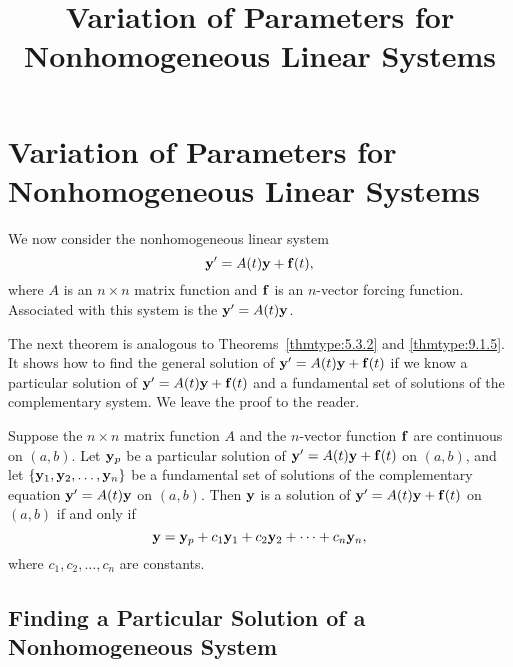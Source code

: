 \documentclass{ximera}
\title{Variation of Parameters for Nonhomogeneous Linear Systems}%
\begin{document}
\begin{abstract}

\end{abstract}

\maketitle

\section*{Variation of Parameters for Nonhomogeneous Linear Systems}

We now consider the nonhomogeneous linear system
$$
{\bf y}'= A(t){\bf y}+{\bf f}(t),
$$
where $A$ is an $n\times n$ matrix function and ${\bf f}$ is an
$n$-vector forcing function. Associated with this system is the  ${\bf y}'=A(t){\bf y}$.

The next theorem is analogous to
Theorems~\ref{thmtype:5.3.2} and
\ref{thmtype:9.1.5}. It shows how to find the general solution
of
${\bf y}'=A(t){\bf y}+{\bf f}(t)$ if we know a particular solution of ${\bf
y}'=A(t){\bf y}+{\bf f}(t)$ and a fundamental set of solutions of the
complementary system. We leave the proof to the reader.

\begin{theorem}\label{thmtype:10.7.1}
Suppose the $n\times n$ matrix function $A$ and the $n$-vector
function ${\bf f}$ are continuous on $(a,b)$. Let ${\bf y}_p$ be a
particular solution of ${\bf y}'=A(t){\bf y}+{\bf f}(t)$ on $(a,b)$,
and let
$\{{\bf y}_1,{\bf y}_2,\dots,{\bf y}_n\}$ be a fundamental set of
solutions of the complementary equation ${\bf y}'=A(t){\bf y}$ on
$(a,b)$. Then ${\bf y}$ is a solution of ${\bf y}'=A(t){\bf y}+{\bf
f}(t)$ on $(a,b)$ if and only if
$$
{\bf y}={\bf y}_p+c_1{\bf y}_1+c_2{\bf y}_2+\cdots+c_n{\bf y}_n,
$$
where $c_1, c_2, \dots, c_n$  are constants.
\end{theorem}

\subsection*{Finding a Particular Solution of a Nonhomogeneous System}
\end{document}
